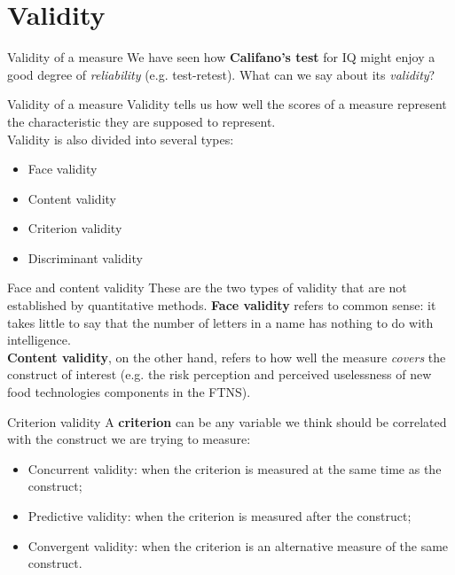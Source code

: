 \documentclass{beamer}
\begin{document}
\section{Validity}
\begin{frame}{Validity of a measure}
    We have seen how \textbf{Califano's test} for IQ might enjoy a good degree of \textit{reliability} (e.g. test-retest). What can we say about its \textit{validity}?
\end{frame}

\begin{frame}{Validity of a measure}
    Validity tells us how well the scores of a measure represent the characteristic they are supposed to represent. \\
    \vspace{1em}
    Validity is also divided into several types:
    \begin{itemize}
        \item Face validity
        \item Content validity
        \item Criterion validity
        \item Discriminant validity
    \end{itemize}
\end{frame}

\begin{frame}{Face and content validity}
    These are the two types of validity that are not established by quantitative methods. \textbf{Face validity} refers to common sense: it takes little to say that the number of letters in a name has nothing to do with intelligence. \\
    \vspace{1em}
    \textbf{Content validity}, on the other hand, refers to how well the measure \textit{covers} the construct of interest (e.g. the risk perception and perceived uselessness of new food technologies components in the FTNS).
\end{frame}

\begin{frame}{Criterion validity}
    A \textbf{criterion} can be any variable we think should be correlated with the construct we are trying to measure: \\
    \begin{itemize}
        \item Concurrent validity: when the criterion is measured at the same time as the construct;
        \item Predictive validity: when the criterion is measured after the construct;
        \item Convergent validity: when the criterion is an alternative measure of the same construct.
    \end{itemize}
\end{frame}
\end{document}
